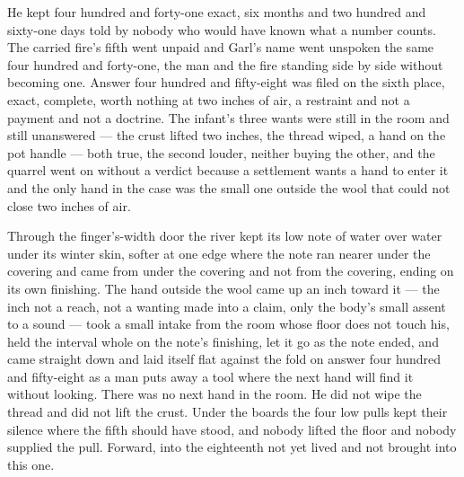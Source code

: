 He kept four hundred and forty-one exact, six months and two hundred and sixty-one days told by nobody who would have known what a number counts. The carried fire's fifth went unpaid and Garl's name went unspoken the same four hundred and forty-one, the man and the fire standing side by side without becoming one. Answer four hundred and fifty-eight was filed on the sixth place, exact, complete, worth nothing at two inches of air, a restraint and not a payment and not a doctrine. The infant's three wants were still in the room and still unanswered --- the crust lifted two inches, the thread wiped, a hand on the pot handle --- both true, the second louder, neither buying the other, and the quarrel went on without a verdict because a settlement wants a hand to enter it and the only hand in the case was the small one outside the wool that could not close two inches of air.

Through the finger's-width door the river kept its low note of water over water under its winter skin, softer at one edge where the note ran nearer under the covering and came from under the covering and not from the covering, ending on its own finishing. The hand outside the wool came up an inch toward it --- the inch not a reach, not a wanting made into a claim, only the body's small assent to a sound --- took a small intake from the room whose floor does not touch his, held the interval whole on the note's finishing, let it go as the note ended, and came straight down and laid itself flat against the fold on answer four hundred and fifty-eight as a man puts away a tool where the next hand will find it without looking. There was no next hand in the room. He did not wipe the thread and did not lift the crust. Under the boards the four low pulls kept their silence where the fifth should have stood, and nobody lifted the floor and nobody supplied the pull. Forward, into the eighteenth not yet lived and not brought into this one.
